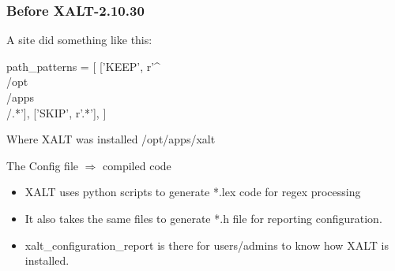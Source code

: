\documentclass{beamer}
\begin{document}
\begin{frame}[fragile]
    \frametitle{Before XALT-2.10.30}
A site did something like this:
 {\small
    \begin{semiverbatim}
path_patterns = [
    ['KEEP',  r'^\\/opt\\/apps\\/.*'],
    ['SKIP',  r'.*'],
  ]
    \end{semiverbatim}
}
Where XALT was installed /opt/apps/xalt
\end{frame}

\begin{frame}{The Config file $\Rightarrow$ compiled code}
  \begin{itemize}
    \item XALT uses python scripts to generate *.lex code for regex processing
    \item It also takes the same files to generate *.h file for
      reporting configuration.
    \item xalt\_configuration\_report is there for users/admins to know
      how XALT is installed.
  \end{itemize}
\end{frame}
\end{document}
